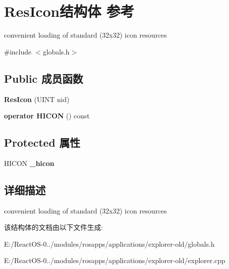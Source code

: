 \hypertarget{struct_res_icon}{}\section{Res\+Icon结构体 参考}
\label{struct_res_icon}


convenient loading of standard (32x32) icon resources  




{\ttfamily \#include $<$globals.\+h$>$}

\subsection*{Public 成员函数}
\begin{DoxyCompactItemize}
\item 
\mbox{\label{struct_res_icon_abe02a496daf6e81b938511d3b0cf7350}} 
{\bfseries Res\+Icon} (U\+I\+NT nid)
\item 
\mbox{\label{struct_res_icon_a22918d9fe07ac0a1095e4ebb529ca3c7}} 
{\bfseries operator H\+I\+C\+ON} () const
\end{DoxyCompactItemize}
\subsection*{Protected 属性}
\begin{DoxyCompactItemize}
\item 
\mbox{\label{struct_res_icon_a53992facb887dca10e9968816cb65857}} 
H\+I\+C\+ON {\bfseries \+\_\+hicon}
\end{DoxyCompactItemize}


\subsection{详细描述}
convenient loading of standard (32x32) icon resources 

该结构体的文档由以下文件生成\+:\begin{DoxyCompactItemize}
\item 
E\+:/\+React\+O\+S-\/0../modules/rosapps/applications/explorer-\/old/globals.\+h\item 
E\+:/\+React\+O\+S-\/0../modules/rosapps/applications/explorer-\/old/explorer.\+cpp\end{DoxyCompactItemize}
